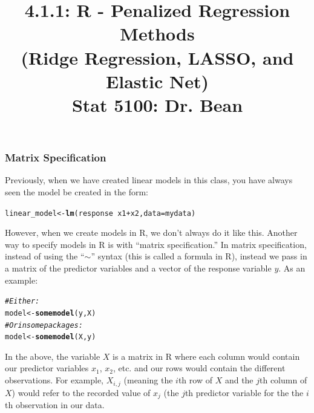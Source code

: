 \documentclass{article}\usepackage[]{graphicx}\usepackage[]{color}
\makeatletter
\newcommand{\hlcom}[1]{\textcolor[rgb]{0.678,0.584,0.686}{\textit{#1}}}%
\newcommand{\hlopt}[1]{\textcolor[rgb]{0,0,0}{#1}}%
\newcommand{\hlstd}[1]{\textcolor[rgb]{0.345,0.345,0.345}{#1}}%
\newcommand{\hlkwb}[1]{\textcolor[rgb]{0.69,0.353,0.396}{#1}}%
\newcommand{\hlkwc}[1]{\textcolor[rgb]{0.333,0.667,0.333}{#1}}%
\newcommand{\hlkwd}[1]{\textcolor[rgb]{0.737,0.353,0.396}{\textbf{#1}}}%
\newenvironment{kframe}{%
 \def\at@end@of@kframe{}%
 \ifinner\ifhmode%
  \def\at@end@of@kframe{\end{minipage}}%
  \begin{minipage}{\columnwidth}%
 \fi\fi%
 \def\FrameCommand##1{\hskip\@totalleftmargin \hskip-\fboxsep
 \colorbox{shadecolor}{##1}\hskip-\fboxsep
     \hskip-\linewidth \hskip-\@totalleftmargin \hskip\columnwidth}%
 \MakeFramed {\advance\hsize-\width
   \@totalleftmargin\z@ \linewidth\hsize
   \@setminipage}}%
 {\par\unskip\endMakeFramed%
 \at@end@of@kframe}
\newenvironment{knitrout}{}{} %
\makeatother
\begin{document}
\title{%
  4.1.1: R - Penalized Regression Methods \\
  (Ridge Regression, LASSO, and Elastic Net) \\
  \smallskip
  \large Stat 5100: Dr. Bean
}
\date{}

\maketitle

\subsubsection*{Matrix Specification}

Previously, when we have created linear models in this class, you have always seen the model be created in the form:

\begin{knitrout}
\color{fgcolor}\begin{kframe}
\begin{alltt}
\hlstd{linear_model} \hlkwb{<-} \hlkwd{lm}\hlstd{(response} \hlopt{~} \hlstd{x1} \hlopt{+} \hlstd{x2,} \hlkwc{data} \hlstd{= mydata)}
\end{alltt}
\end{kframe}
\end{knitrout}

However, when we create models in R, we don't always do it like this. Another way to specify models in R is with ``matrix specification.'' In matrix specification, instead of using the ``$\sim$'' syntax (this is called a formula in R), instead we pass in a matrix of the predictor variables and a vector of the response variable $y$. As an example:

\begin{knitrout}
\color{fgcolor}\begin{kframe}
\begin{alltt}
\hlcom{# Either:}
\hlstd{model} \hlkwb{<-} \hlkwd{somemodel}\hlstd{(y, X)}
\hlcom{# Or in some packages:}
\hlstd{model} \hlkwb{<-} \hlkwd{somemodel}\hlstd{(X, y)}
\end{alltt}
\end{kframe}
\end{knitrout}

In the above, the variable $X$ is a matrix in R where each column would contain our predictor variables $x_1$, $x_2$, etc. and our rows would contain the different observations. For example, $X_{i, j}$ (meaning the $i$th row of $X$ and the $j$th column of $X$) would refer to the recorded value of $x_j$ (the $j$th predictor variable for the the $i$th observation in our data.
\end{document}
